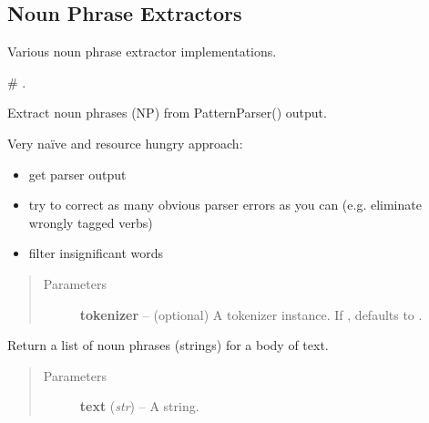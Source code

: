 \documentclass[letterpaper,10pt,english]{sphinxmanual}
\begin{document}
\subsection{Noun Phrase Extractors}
\label{api_reference:noun-phrase-extractors}\label{api_reference:module-textblob_de.np_extractors}
Various noun phrase extractor implementations.

\# {\hyperref[api_reference:textblob_de.np_extractors.PatternParserNPExtractor]{}}.

\begin{fulllineitems}
\label{api_reference:textblob_de.np_extractors.PatternParserNPExtractor}
Extract noun phrases (NP) from PatternParser() output.

Very naïve and resource hungry approach:
\begin{itemize}
\item {} 
get parser output

\item {} 
try to correct as many obvious parser errors as you can (e.g. eliminate wrongly tagged verbs)

\item {} 
filter insignificant words

\end{itemize}
\begin{quote}\begin{description}
\item[{Parameters}] \leavevmode
\textbf{tokenizer} -- (optional) A tokenizer instance. If , defaults to
{\hyperref[api_reference:textblob_de.tokenizers.PatternTokenizer]{}}.

\end{description}\end{quote}

\begin{fulllineitems}
\label{api_reference:textblob_de.np_extractors.PatternParserNPExtractor.extract}
Return a list of noun phrases (strings) for a body of text.
\begin{quote}\begin{description}
\item[{Parameters}] \leavevmode
\textbf{text} (\emph{str}) -- A string.

\end{description}\end{quote}

\end{fulllineitems}


\end{fulllineitems}
\end{document}
